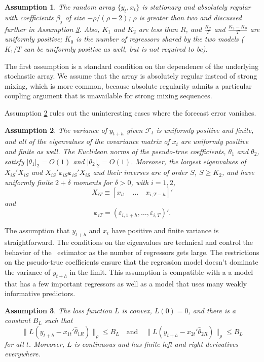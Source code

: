 \documentclass[11pt]{article}
\newtheorem{asmp}{Assumption}
\newcommand{\h}{h}
\newcommand{\bh}[1]{\ensuremath{\hat\theta_{#1}}}
\newcommand{\ep}[1]{\ensuremath{\boldsymbol{\varepsilon}_{#1}}}
\begin{document}
\begin{asmp}\label{asmp-1} 
  The random array $\{y_t,x_t\}$ is stationary and
  absolutely regular with coefficients $\beta_j$ of size
  $-\rho/(\rho-2)$; $\rho$ is greater than two and discussed further
  in Assumption \ref{asmp-3}.  Also, $K_1$ and $K_2$ are less than $R$,
  and $\frac{K_2}{T}$ and $\frac{K_2-K_0}{T}$ are uniformly positive;
  $K_0$ is the number of regressors shared by the two models ($K_1/T$
  can be uniformly positive as well, but is not required to be).
\end{asmp}

The first assumption is a standard condition on the dependence of the
underlying stochastic array.  We assume that the array is absolutely
regular instead of strong mixing, which is more common, because
absolute regularity admits a particular coupling argument
\citep{berbee_random_1979} that is unavailable for strong mixing
sequences.

Assumption \ref{asmp-2} rules out the uninteresting cases where the
forecast error vanishes.
\begin{asmp}\label{asmp-2}
  The variance of $y_{t+\h}$ given $\mathcal{F}_t$ is uniformly
  positive and finite, and all of the eigenvalues of the covariance
  matrix of $x_t$ are uniformly positive and finite as well.  The
  Euclidean norms of the pseudo-true coefficients, $\theta_1$ and
  $\theta_2$, satisfy $|\theta_1|_2 = O(1)$ and $|\theta_2|_2 = O(1)$.
  Moreover, the largest eigenvalues of $X_{iS}'X_{iS}$ and
  $X_{iS}'\ep{iS}\ep{iS}'X_{iS}$ and their inverses are of order $S$,
  $S \geq K_2$, and have uniformly finite $2+\delta$ moments for
  $\delta > 0$, with $i = 1,2$,
  \[ X_{iT} \equiv [x_{i1} \quad \dots \quad x_{i,T-\h}]' \]
  and
  \[ \ep{iT} = (\varepsilon_{i,1+\h}, \dots, \varepsilon_{i,T})'.\]
\end{asmp}

The assumption that $y_{t+\h}$ and $x_t$ have positive and finite
variance is straightforward.  The conditions on the eigenvalues are
technical and control the behavior of the \ols\ estimator as the
number of regressors gets large.  The restrictions on the pseudo-true
coefficients ensure that the regression model doesn't dominate the
variance of $y_{t+\h}$ in the limit.  This assumption is compatible
with a a model that has a few important regressors as well as a model
that uses many weakly informative predictors.

\begin{asmp}\label{asmp-3}
  The loss function $L$ is convex, $L(0) = 0$, and there is a constant $B_L$ such that
  \begin{equation*}
    \|L(y_{t+\h} - x_{1t}'\bh{1R})\|_\rho \leq B_L \quad\text{and}\quad
    \|L(y_{t+\h} - x_{2t}'\bh{2R})\|_\rho \leq B_L
  \end{equation*}
  for all $t$.  Moreover, $L$ is continuous and has finite left and
  right derivatives everywhere.
\end{asmp}
\end{document}
